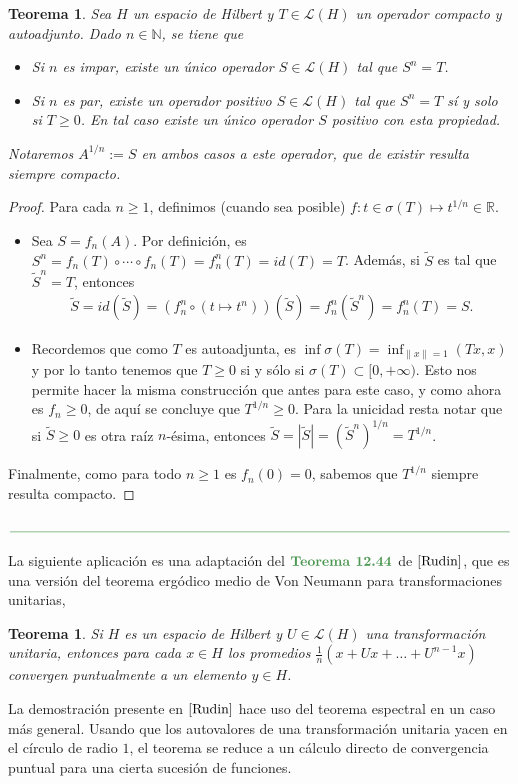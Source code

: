 \documentclass[11pt]{report}
\theoremstyle{colored}
\newtheorem{theorem}{Teorema}[section]
\newtheorem*{theorem*}{Teorema}
\newcommand{\N}{\mathbb{N}}
\newcommand{\R}{\mathbb{R}}
\newcommand{\paint}[1]{\color{color}{#1}}
\newcommand{\tpaint}[1]{\paint{\textbf{#1}}}
\newcommand{\paintline}{\begin{center}
$\paint{
\rule{400pt}{0.5pt}
}$
\vspace{10pt}
\end{center}}
\begin{document}
\begin{theorem}  Sea $H$ un espacio de Hilbert y $T \in \mathscr{L}(H)$ un operador compacto y autoadjunto. Dado $n \in \N$, se tiene que 
\begin{itemize}
\item[(i)] Si $n$ es impar, existe un único operador $S \in \mathscr{L}(H)$ tal que $S^n = T$.
\item[(ii)] Si $n$ es par, existe un operador positivo $S \in \mathscr{L}(H)$ tal que $S^n = T$ sí y solo si $T \geq 0$. En tal caso existe un único operador $S$ positivo con esta propiedad.
\end{itemize}
Notaremos $A^{1/n} := S$ en ambos casos a este operador, que de existir resulta siempre compacto.
\end{theorem}
\begin{proof} Para cada $n \geq 1$, definimos (cuando sea posible) $f :t \in \sigma(T) \mapsto t^{1/n} \in \R$.
\begin{itemize}[listparindent = \parindent] 
\item[(i)] Sea $S = f_n(A)$. Por definición, es $S^n = f_n(T) \circ \cdots \circ f_n(T) = f_n^n(T) = id(T) = T$. Además, si $\widetilde{S}$ es tal que $\widetilde{S}^n = T$, entonces
\begin{align*}
\widetilde{S} = id(\widetilde{S}) = (f_n^n \circ (t \mapsto t^n))(\widetilde{S}) = f_n^n(\widetilde{S}^n) = f_n^n(T) = S.
\end{align*}
\item[(ii)] Recordemos que como $T$ es autoadjunta, es $\inf \sigma(T) = \inf_{\|x\| = 1} (Tx,x)$ y por lo tanto tenemos que $T \geq 0$ si y sólo si $\sigma(T) \subset [0,+\infty)$. 
Esto nos permite hacer la misma construcción que antes para este caso, y como ahora es $f_n \geq 0$, de aquí se concluye que $T^{1/n} \geq 0$. Para la unicidad resta notar que si $\widetilde{S} \geq 0$ es otra raíz $n$-ésima, entonces $\widetilde{S} = |\widetilde{S}| = (\widetilde{S}^n)^{1/n} = T^{1/n}$.
\end{itemize}

Finalmente, como para todo $n \geq 1$ es $f_n(0) = 0$, sabemos que $T^{1/n}$ siempre resulta compacto.
\end{proof}

\paintline

La siguiente aplicación es una adaptación del $\tpaint{Teorema 12.44}$ de $\cite{Rudin}$, que es una versión del teorema ergódico medio de Von Neumann para transformaciones unitarias,

\begin{tcolorbox}
\begin{theorem*} Si $H$ es un espacio de Hilbert y $U \in \mathscr{L}(H)$ una transformación unitaria, entonces para cada $x \in H$ los \textit{promedios} $\frac{1}{n}(x + Ux + \dots + U^{n-1}x)$ convergen puntualmente a un elemento $y \in H$.
\end{theorem*}
\end{tcolorbox}
La demostración presente en $\cite{Rudin}$ hace uso del teorema espectral en un caso más general. Usando que los autovalores de una transformación unitaria yacen en el círculo de radio $1$, el teorema se reduce a un cálculo directo de convergencia puntual para una cierta sucesión de funciones.
\end{document}
